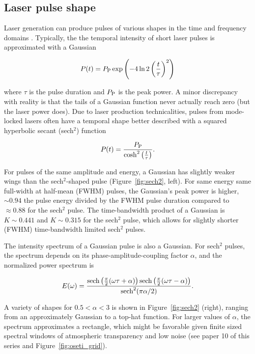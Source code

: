 \documentclass[twocolumn,tighten,longauthor]{myaastex62}
\begin{document}
\subsection{Laser pulse shape}
\label{sub:pulse_shape}
Laser generation can produce pulses of various shapes in the time and frequency domains \citep{Smith1970,Hao2013}. Typically, the the temporal intensity of short laser pulses is approximated with a Gaussian

\begin{equation}
P(t)=P_{\rm P} \, {\rm exp} \left(-4\ln2 \left(\frac{t}{\tau}\right)^2\right)
\end{equation}

where $\tau$ is the pulse duration and $P_{\rm P}$ is the peak power. A minor discrepancy with reality is that the tails of a Gaussian function never actually reach zero (but the laser power does). Due to laser production technicalities, pulses from mode-locked lasers often have a temporal shape better described with a squared hyperbolic secant (sech$^2$) function \citep{Lazaridis1995}

\begin{equation}
P(t)= \frac{P_{\rm P}}{\mathrm{cosh}^2\left( \frac{t}{\tau} \right)}.
\end{equation}

For pulses of the same amplitude and energy, a Gaussian has slightly weaker wings than the sech$^2$-shaped pulse (Figure~\ref{fig:sech2}, left). For same energy same full-width at half-mean (FWHM) pulses, the Gaussian's peak power is higher, $\sim0.94$ the pulse energy divided by the FWHM pulse duration compared to $\approx0.88$ for the sech$^2$ pulse. The time-bandwidth product of a Gaussian is $K\sim0.441$ and $K\sim0.315$ for the sech$^2$ pulse, which allows for slightly shorter (FWHM) time-bandwidth limited sech$^2$ pulses.

The intensity spectrum of a Gaussian pulse is also a Gaussian. For sech$^2$ pulses, the spectrum depends on its phase-amplitude-coupling factor $\alpha$, and the normalized power spectrum is \citep{Lazaridis1995}

\begin{equation}
E(\omega) = \frac{{\rm sech} \left( \frac{\pi}{2} (\omega \tau + \alpha)\right) {\rm sech} \left( \frac{\pi}{2} (\omega \tau - \alpha) \right)  }{{\rm sech}^2(\pi \alpha / 2)}.
\end{equation}

A variety of shapes for $0.5<\alpha<3$ is shown in Figure~\ref{fig:sech2} (right), ranging from an approximately Gaussian to a top-hat function. For larger values of $\alpha$, the spectrum approximates a rectangle, which might be favorable given finite sized spectral windows of atmospheric transparency and low noise (see paper 10 of this series and Figure~\ref{fig:oseti_grid}).
\end{document}
